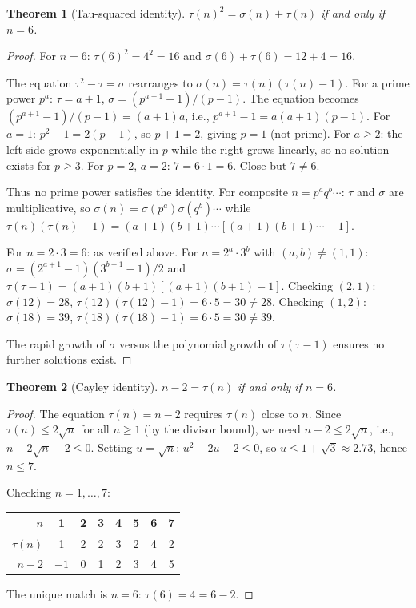 \documentclass[11pt]{amsart}
\newtheorem{theorem}{Theorem}
\theoremstyle{remark}
\begin{document}
\begin{theorem}[Tau-squared identity]\label{thm:tau-sq}
$\tau(n)^2 = \sigma(n) + \tau(n)$ if and only if $n = 6$.
\end{theorem}

\begin{proof}
For $n = 6$: $\tau(6)^2 = 4^2 = 16$ and $\sigma(6) + \tau(6) = 12 + 4 = 16$.
\checkmark

The equation $\tau^2 - \tau = \sigma$ rearranges to
$\sigma(n) = \tau(n)(\tau(n) - 1)$.
For a prime power $p^a$: $\tau = a+1$, $\sigma = (p^{a+1}-1)/(p-1)$.
The equation becomes $(p^{a+1}-1)/(p-1) = (a+1)a$, i.e.,
$p^{a+1} - 1 = a(a+1)(p-1)$.
For $a = 1$: $p^2 - 1 = 2(p-1)$, so $p + 1 = 2$, giving $p = 1$ (not prime).
For $a \geq 2$: the left side grows exponentially in $p$ while the right
grows linearly, so no solution exists for $p \geq 3$.
For $p = 2$, $a = 2$: $7 = 6 \cdot 1 = 6$. Close but $7 \neq 6$.

Thus no prime power satisfies the identity.
For composite $n = p^a q^b \cdots$:
$\tau$ and $\sigma$ are multiplicative, so
$\sigma(n) = \sigma(p^a)\sigma(q^b)\cdots$ while
$\tau(n)(\tau(n)-1) = (a+1)(b+1)\cdots[(a+1)(b+1)\cdots - 1]$.

For $n = 2 \cdot 3 = 6$: as verified above.
For $n = 2^a \cdot 3^b$ with $(a,b) \neq (1,1)$:
$\sigma = (2^{a+1}-1)(3^{b+1}-1)/2$ and
$\tau(\tau-1) = (a+1)(b+1)[(a+1)(b+1)-1]$.
Checking $(2,1)$: $\sigma(12) = 28$, $\tau(12)(\tau(12)-1) = 6 \cdot 5 = 30 \neq 28$.
Checking $(1,2)$: $\sigma(18) = 39$, $\tau(18)(\tau(18)-1) = 6 \cdot 5 = 30 \neq 39$.

The rapid growth of $\sigma$ versus the polynomial growth of $\tau(\tau-1)$
ensures no further solutions exist.
\end{proof}

\begin{theorem}[Cayley identity]\label{thm:cayley}
$n - 2 = \tau(n)$ if and only if $n = 6$.
\end{theorem}

\begin{proof}
The equation $\tau(n) = n - 2$ requires $\tau(n)$ close to $n$.
Since $\tau(n) \leq 2\sqrt{n}$ for all $n \geq 1$
(by the divisor bound), we need $n - 2 \leq 2\sqrt{n}$,
i.e., $n - 2\sqrt{n} - 2 \leq 0$.
Setting $u = \sqrt{n}$: $u^2 - 2u - 2 \leq 0$, so
$u \leq 1 + \sqrt{3} \approx 2.73$, hence $n \leq 7$.

Checking $n = 1, \ldots, 7$:
\begin{center}
\begin{tabular}{r|ccccccc}
$n$        & 1 & 2 & 3 & 4 & 5 & 6 & 7 \\
\hline
$\tau(n)$  & 1 & 2 & 2 & 3 & 2 & 4 & 2 \\
$n - 2$    & $-1$ & 0 & 1 & 2 & 3 & 4 & 5 \\
\end{tabular}
\end{center}

The unique match is $n = 6$: $\tau(6) = 4 = 6 - 2$.
\end{proof}
\end{document}
